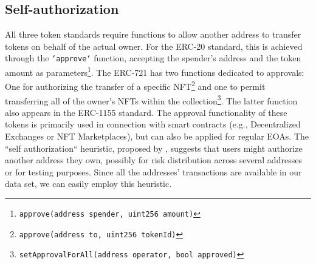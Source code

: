 \documentclass[12pt,a4paper,titlepage,oneside,english]{article}
\begin{document}
\subsection{Self-authorization} 
	All three token standards require functions to allow another address to transfer tokens on behalf of the actual owner. For the ERC-20 standard, this is achieved through the \texttt{`approve`} function, accepting the spender's address and the token amount as parameters\footnote{\texttt{approve(address spender, uint256 amount)}}. The ERC-721 has two functions dedicated to approvals: One for authorizing the transfer of a specific NFT\footnote{\texttt{approve(address to, uint256 tokenId)}} and one to permit transferring all of the owner's NFTs within the collection\footnote{\texttt{setApprovalForAll(address operator, bool approved)}}. The latter function also appears in the ERC-1155 standard. The approval functionality of these tokens is primarily used in connection with smart contracts (e.g., Decentralized Exchanges or NFT Marketplaces), but can also be applied for regular EOAs. \newline
The ``self authorization`` heuristic, proposed by \cite{FV:17}, suggests that users might authorize another address they own, possibly for risk distribution across several addresses or for testing purposes. \newline
Since all the addresses' transactions are available in our data set, we can easily employ this heuristic.

\iffalse
For the ERC-20 standard: \texttt{approve(address spender, uint256 amount)}
For the ERC-721 standard: \texttt{approve(address to, uint256 tokenId)} and \texttt{setApprovalForAll(address operator, bool approved)}\\
For the ERC-1155 standard: \texttt{setApprovalForAll(address operator, bool approved)}
\fi
\end{document}
